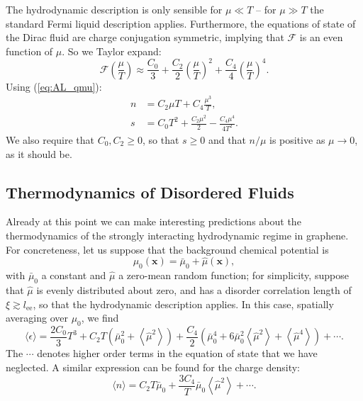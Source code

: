 The hydrodynamic description is only sensible for $\mu \ll T$ -- for $\mu \gg T$ the standard Fermi liquid description applies.   Furthermore, the equations of state of the Dirac fluid are charge conjugation symmetric, implying that $\mathcal{F}$ is an even function of $\mu$.   So we Taylor expand: \begin{equation}
\mathcal{F}\left(\frac{\mu}{T}\right) \approx \frac{C_0}{3} + \frac{C_2}{2} \left(\frac{\mu}{T}\right)^2 +  \frac{C_4}{4} \left(\frac{\mu}{T}\right)^4.  \label{eq:AL_feq}
\end{equation} Using (\ref{eq:AL_qmu}): \begin{subequations}\begin{align}
n &= C_2 \mu T + C_4 \frac{\mu^3}{T}, \\
s &= C_0T^2 + \frac{C_2 \mu^2}{2} - \frac{C_4 \mu^4}{4T^2} .
\end{align}\end{subequations}
We also require that $C_0,C_2\ge 0$, so that $s\ge 0$ and that $n/\mu$ is positive as $\mu\rightarrow 0$, as it should be.


\subsection{Thermodynamics of Disordered Fluids}
Already at this point we can make interesting predictions about the thermodynamics of the strongly interacting hydrodynamic regime in graphene.   For concreteness, let us suppose that the background chemical potential is \begin{equation}
\mu_0(\mathbf{x}) = \bar\mu_0 + \hat\mu(\mathbf{x}),
\end{equation}
with $\bar\mu_0$ a constant and $\hat\mu$ a zero-mean random function;  for simplicity, suppose that $\hat\mu$ is evenly distributed about zero, and has a disorder correlation length of $\xi\gtrsim l_{\mathrm{ee}}$, so that the hydrodynamic description applies.   In this case, spatially averaging over $\mu_0$, we find \begin{equation}
\langle \epsilon\rangle = \frac{2C_0}{3}T^3  + C_2T\left(\bar\mu_0^2+\left\langle \hat\mu^2\right\rangle \right) + \frac{C_4}{2}\left(\bar\mu_0^4 + 6\bar\mu_0^2\left\langle \hat\mu^2\right\rangle + \left\langle \hat\mu^4\right\rangle\right) + \cdots.
\end{equation}
The $\cdots$ denotes higher order terms in the equation of state that we have neglected.  A similar expression can be found for the charge density: \begin{equation}
\langle n\rangle = C_2 T \bar\mu_0 + \frac{3C_4}{T}\bar\mu_0 \left\langle \hat\mu^2\right\rangle + \cdots.
\end{equation}

